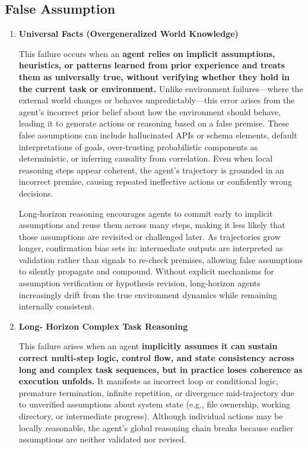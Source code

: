 \documentclass[11pt]{article}
\begin{document}
\subsection{False Assumption}
\begin{enumerate}
\item \textbf{Universal
Facts (Overgeneralized World
Knowledge)}

This failure occurs when an \textbf{agent relies on implicit assumptions, heuristics, or patterns learned from prior experience and treats them as universally true, without verifying whether they hold in the current task or environment.} Unlike environment failures—where the external world changes or behaves unpredictably—this error arises from the agent’s incorrect prior belief about how the environment should behave, leading it to generate actions or reasoning based on a false premise.
These false assumptions can include hallucinated APIs or schema elements, default interpretations of goals, over-trusting probabilistic components as deterministic, or inferring causality from correlation. Even when local reasoning steps appear coherent, the agent’s trajectory is grounded in an incorrect premise, causing repeated ineffective actions or confidently wrong decisions.

Long-horizon reasoning encourages agents to commit early to implicit assumptions and reuse them across many steps, making it less likely that those assumptions are revisited or challenged later. As trajectories grow longer, confirmation bias sets in: intermediate outputs are interpreted as validation rather than signals to re-check premises, allowing false assumptions to silently propagate and compound. Without explicit mechanisms for assumption verification or hypothesis revision, long-horizon agents increasingly drift from the true environment dynamics while remaining internally consistent.

\item \textbf{Long-
Horizon Complex Task Reasoning}

This failure arises when an agent \textbf{implicitly assumes it can sustain correct multi-step logic, control flow, and state consistency across long and complex task sequences, but in practice loses coherence as execution unfolds. }It manifests as incorrect loop or conditional logic, premature termination, infinite repetition, or divergence mid-trajectory due to unverified assumptions about system state (e.g., file ownership, working directory, or intermediate progress). Although individual actions may be locally reasonable, the agent’s global reasoning chain breaks because earlier assumptions are neither validated nor revised.


\end{enumerate}
\end{document}
